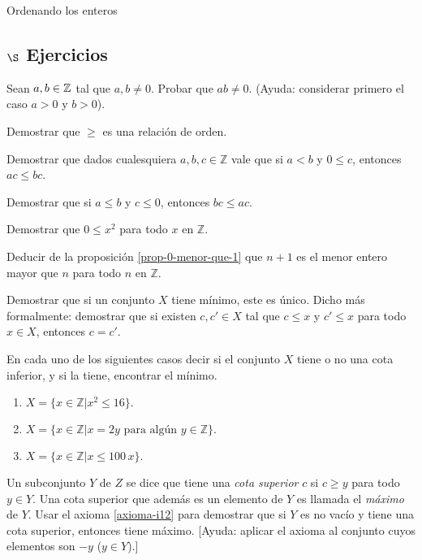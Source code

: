 \begin{section}{Ordenando los enteros}
\subsection*{$\S$ Ejercicios}
\begin{enumex}

    \item Sean $a, b \in {\mathbb Z}$ tal que $a,b \ne 0$. Probar que $ab \ne 0$. (Ayuda: considerar primero el caso  $a>0$ y $b >0$). 
    
    \item Demostrar que $\ge$ es una relación de orden.
        
    \item Demostrar que dados cualesquiera $a,b,c \in \mathbb Z$ vale que si $a< b$ y $0\le c$, entonces $ac \le bc$. 
        
    \item Demostrar que si $a\le b$ y $c\le 0$, entonces $bc \le ac$.
        
    \item Demostrar que $0\le x^2$ para todo $x$ en $\mathbb Z$.
        
    \item Deducir de la proposición \ref{prop-0-menor-que-1} que $n+1$ es el menor entero mayor que $n$ para todo $n$ en $\mathbb Z$.

    \item Demostrar que si un conjunto $X$ tiene mínimo, este es único. Dicho más formalmente: demostrar que si existen $c,c' \in X$ tal que  $c\le x$ y $c'\le x$ para todo $x \in X$, entonces $c=c'$. 

    \item En cada uno de los siguientes casos decir si el conjunto $X$ tiene o no una cota inferior, y si la tiene, encontrar el mínimo.
    \begin{enumerate}
        \item $X = \{x \in \mathbb Z | x^2\le 16\}.$
        \item $X =\{x \in \mathbb Z | x=2y \text{\ para algún } y \in \mathbb Z\}.$
        \item $X =\{x \in \mathbb Z | x\le 100\,x\} .$
    \end{enumerate}
    \item Un subconjunto $Y$ de $Z$ se dice que tiene una \textit{cota superior} $c$ si $c\ge y$ para todo $y \in Y$.  Una cota superior que además es un elemento de $Y$ es llamada el \textit{máximo} de $Y$. Usar el axioma \ref{axioma-i12} para demostrar que si $Y$ es no vacío y tiene una cota superior, entonces tiene máximo. [Ayuda: aplicar el axioma al conjunto cuyos elementos son $-y$ ($y \in Y$).]


\end{enumex}
\end{section}

